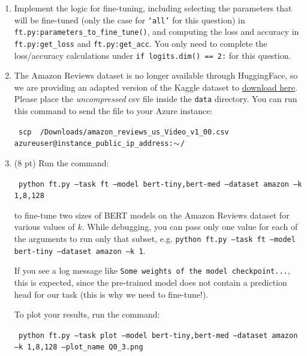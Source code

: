 \documentclass[12pt]{article}
\begin{document}
\begin{enumerate}
    \item Implement the logic for fine-tuning, including selecting the parameters that will be fine-tuned (only the case for \texttt{`all'} for this question) in \texttt{ft.py:\allowbreak parameters\_to\allowbreak \_fine\_tune()}, and computing the loss and accuracy in \texttt{ft.py:\allowbreak get\_loss} and \texttt{ft.py:\allowbreak get\_acc}. You only need to complete the loss/accuracy calculations under \texttt{if logits.dim() == 2:} for this question.
    \item The Amazon Reviews dataset is no longer available through HuggingFace, so we are providing an adapted version of the Kaggle dataset to \href{https://drive.google.com/file/d/1RLCPCEvJVTvUbn-D426Avwg6hynSBgU3/view?usp=sharing}{download here}. Please place the \textit{uncompressed} csv file inside the \texttt{data} directory. You can run this command to send the file to your Azure instance:

    {
    \small\texttt{
    scp ~/Downloads/amazon\_reviews\_us\_Video\_v1\_00.csv azureuser@{instance\_public\_ip\_address}:$\small\sim$/
    }
    }
    \item (8 pt) Run the command:
    
    {\small\texttt{
    python ft.py --task ft --model bert-tiny,bert-med --dataset amazon --k 1,8,128
    }}
    
    to fine-tune two sizes of BERT models on the Amazon Reviews dataset for various values of $k$. While debugging, you can pass only one value for each of the arguments to run only that subset, e.g. \texttt{python ft.py --task ft --model bert-tiny --dataset amazon --k 1}.
    
    If you see a log message like \texttt{Some weights of the model checkpoint...}, this is expected, since the pre-trained model does not contain a prediction head for our task (this is why we need to fine-tune!).

    To plot your results, run the command:
    
    {\small\texttt{
    python ft.py --task plot --model bert-tiny,bert-med --dataset amazon --k 1,8,128 --plot\_name Q0\_3.png
    }}
    

\end{enumerate}
\end{document}
